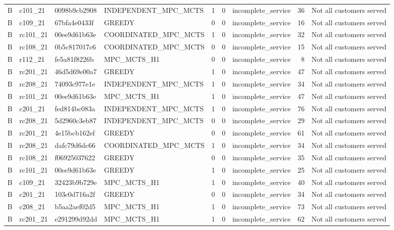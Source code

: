 \begin{table}
{\begin{tabular}{llllrrlrl}
B & c101\_21 & 0098b9cb2908 & INDEPENDENT\_MPC\_MCTS & 1 & 0 & incomplete\_service & 36 & Not all customers served \\
B & c109\_21 & 67bfa4e0433f & GREEDY & 0 & 0 & incomplete\_service & 16 & Not all customers served \\
B & rc101\_21 & 00ee9d61b63e & COORDINATED\_MPC\_MCTS & 1 & 0 & incomplete\_service & 32 & Not all customers served \\
B & rc108\_21 & 0b5c817017c6 & COORDINATED\_MPC\_MCTS & 0 & 0 & incomplete\_service & 15 & Not all customers served \\
B & r112\_21 & fe5a81f8226b & MPC\_MCTS\_H1 & 0 & 0 & incomplete\_service & 8 & Not all customers served \\
B & rc201\_21 & 46d5d69e00a7 & GREEDY & 1 & 0 & incomplete\_service & 47 & Not all customers served \\
B & rc208\_21 & 74093c977e1e & INDEPENDENT\_MPC\_MCTS & 1 & 0 & incomplete\_service & 34 & Not all customers served \\
B & rc101\_21 & 00ee9d61b63e & MPC\_MCTS\_H1 & 1 & 0 & incomplete\_service & 47 & Not all customers served \\
B & c201\_21 & fed814bc083a & INDEPENDENT\_MPC\_MCTS & 1 & 0 & incomplete\_service & 76 & Not all customers served \\
B & rc208\_21 & 5d2960c3eb87 & INDEPENDENT\_MPC\_MCTS & 0 & 0 & incomplete\_service & 29 & Not all customers served \\
B & rc201\_21 & 4e15bcb162ef & GREEDY & 0 & 0 & incomplete\_service & 61 & Not all customers served \\
B & rc208\_21 & dafc79d6dc66 & COORDINATED\_MPC\_MCTS & 1 & 0 & incomplete\_service & 34 & Not all customers served \\
B & rc108\_21 & f06925037622 & GREEDY & 0 & 0 & incomplete\_service & 35 & Not all customers served \\
B & rc101\_21 & 00ee9d61b63e & GREEDY & 1 & 0 & incomplete\_service & 25 & Not all customers served \\
B & c109\_21 & 32423b9b729e & MPC\_MCTS\_H1 & 1 & 0 & incomplete\_service & 40 & Not all customers served \\
B & c201\_21 & 103c0d716a2f & GREEDY & 0 & 0 & incomplete\_service & 34 & Not all customers served \\
B & c208\_21 & b5aa2aef02d5 & MPC\_MCTS\_H1 & 1 & 0 & incomplete\_service & 73 & Not all customers served \\
B & rc201\_21 & e291299d92dd & MPC\_MCTS\_H1 & 1 & 0 & incomplete\_service & 62 & Not all customers served \\

\end{tabular}}
\end{table}
